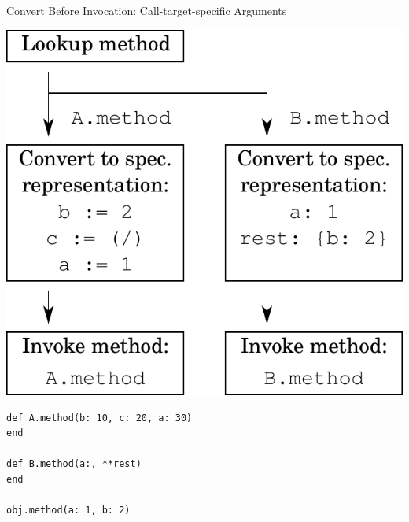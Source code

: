 \documentclass[xcolor=dvipsname]{beamer} %
\begin{document}
\begin{frame}[fragile]{Convert Before Invocation: Call-target-specific Arguments}
\begin{minipage}{0.55\textwidth}
\centering
\includegraphics[height=0.6\textheight]{convert_before2.pdf}
\end{minipage} %
\begin{minipage}{0.4\textwidth}
\begin{lstlisting}
def A.method(b: 10, c: 20, a: 30)
end

def B.method(a:, **rest)
end

obj.method(a: 1, b: 2)
\end{lstlisting}
\end{minipage}
\end{frame}
\end{document}
